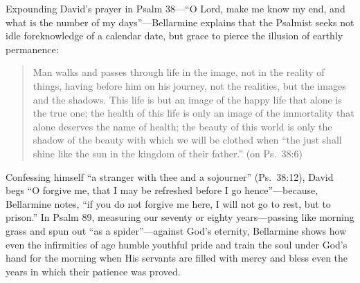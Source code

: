 Expounding David's prayer in Psalm 38---``O Lord, make me know my end, and what is the number of my days''---Bellarmine explains that the Psalmist seeks not idle foreknowledge of a calendar date, but grace to pierce the illusion of earthly permanence:

\begin{quote}
Man walks and passes through life in the image, not in the reality of things, having before him on his journey, not the realities, but the images and the shadows. This life is but an image of the happy life that alone is the true one; the health of this life is only an image of the immortality that alone deserves the name of health; the beauty of this world is only the shadow of the beauty with which we will be clothed when ``the just shall shine like the sun in the kingdom of their father.'' (on Ps.\ 38:6)
\end{quote}

Confessing himself ``a stranger with thee and a sojourner'' (Ps.\ 38:12), David begs ``O forgive me, that I may be refreshed before I go hence''---because, Bellarmine notes, ``if you do not forgive me here, I will not go to rest, but to prison.'' In Psalm 89, measuring our seventy or eighty years---passing like morning grass and spun out ``as a spider''---against God's eternity, Bellarmine shows how even the infirmities of age humble youthful pride and train the soul under God's hand for the morning when His servants are filled with mercy and bless even the years in which their patience was proved.
